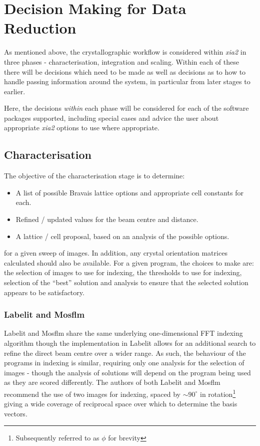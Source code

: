 \documentclass[preprint,pdf]{iucr}
\begin{document}
\section{Decision Making for Data Reduction}

As mentioned above, the crystallographic workflow is considered within
\emph{xia2} in three phases - characterisation, integration and
scaling. Within each of these there will be decisions which need to be
made as well as decisions as to how to handle passing information
around the system, in particular from later stages to earlier. 

Here, the decisions \emph{within} each phase will be considered for
each of the software packages supported, including special cases and
advice the user about appropriate \emph{xia2} options to use where
appropriate.

\subsection{Characterisation}

The objective of the characterisation stage is to determine:

\begin{itemize}
\item{A list of possible Bravais lattice options and appropriate cell
    constants for each.}
\item{Refined / updated values for the beam centre and distance.}
\item{A lattice / cell proposal, based on an analysis of the possible
    options.}
\end{itemize}

\noindent
for a given sweep of images. In addition, any crystal orientation
matrices calculated
should also be available. For a given program, the choices to make
are: the selection of images to use for indexing, the thresholds to
use for indexing, selection of the ``best'' solution and analysis to
ensure that the selected solution appears to be satisfactory. 

\subsubsection{Labelit and Mosflm}

Labelit and Mosflm share the same underlying one-dimensional FFT
indexing algorithm \cite{Steller:mf0013} though the
implementation in Labelit allows for an additional search to refine
the direct beam centre over a wider range. As such, the behaviour of
the programs in indexing is similar, requiring only one analysis for
the selection of images - though the analysis of solutions will depend
on the program being used as they are scored differently.
The authors of both Labelit and Mosflm recommend the use of two images
for indexing, spaced by $\sim 90^{\circ}$ in rotation\footnote{Subsequently
referred to as $\phi$ for brevity} giving a wide coverage of
reciprocal space over which to determine the basis vectors. 
\end{document}
